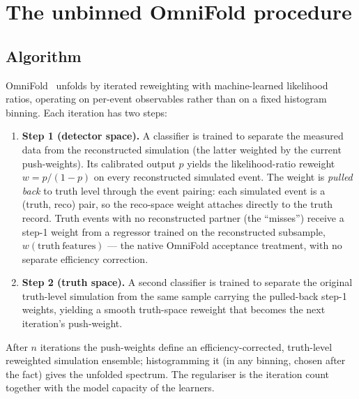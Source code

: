 \section{The unbinned OmniFold procedure}
\label{sec:method}

\subsection{Algorithm}
\label{sec:method-algo}
OmniFold~\cite{Andreassen:2019cjw,Andreassen:2021zzk} unfolds by iterated
reweighting with machine-learned likelihood ratios, operating on per-event
observables rather than on a fixed histogram binning. Each iteration has two
steps:
\begin{enumerate}[itemsep=2pt]
  \item \textbf{Step 1 (detector space).} A classifier is trained to separate
        the measured data from the reconstructed simulation (the latter
        weighted by the current push-weights). Its calibrated output $p$
        yields the likelihood-ratio reweight $w = p/(1-p)$ on every
        reconstructed simulated event. The weight is \emph{pulled back} to
        truth level through the event pairing: each simulated event is a
        (truth, reco) pair, so the reco-space weight attaches directly to the
        truth record. Truth events with no reconstructed partner (the
        ``misses'') receive a step-1 weight from a regressor trained on the
        reconstructed subsample, $w(\mathrm{truth\ features})$ --- the native
        OmniFold acceptance treatment, with no separate efficiency
        correction.
  \item \textbf{Step 2 (truth space).} A second classifier is trained to
        separate the original truth-level simulation from the same sample
        carrying the pulled-back step-1 weights, yielding a smooth truth-space
        reweight that becomes the next iteration's push-weight.
\end{enumerate}
After $n$ iterations the push-weights define an efficiency-corrected,
truth-level reweighted simulation ensemble; histogramming it (in any binning,
chosen after the fact) gives the unfolded spectrum. The regulariser is the
iteration count together with the model capacity of the learners.

